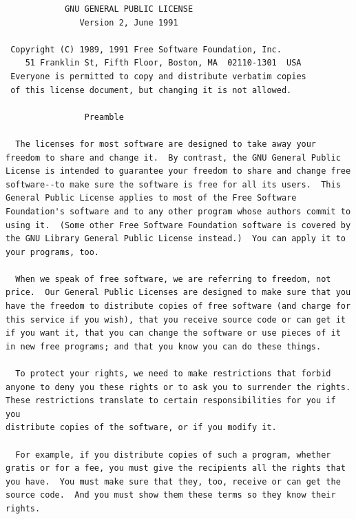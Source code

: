 \documentclass[mingoth,a4paper]{jsarticle}
\begin{document}

\begin{multicols}{2}
 \begin{fontsize}{6}{6}
 \begin{verbatim}
            GNU GENERAL PUBLIC LICENSE
               Version 2, June 1991

 Copyright (C) 1989, 1991 Free Software Foundation, Inc.
    51 Franklin St, Fifth Floor, Boston, MA  02110-1301  USA
 Everyone is permitted to copy and distribute verbatim copies
 of this license document, but changing it is not allowed.

                Preamble

  The licenses for most software are designed to take away your
freedom to share and change it.  By contrast, the GNU General Public
License is intended to guarantee your freedom to share and change free
software--to make sure the software is free for all its users.  This
General Public License applies to most of the Free Software
Foundation's software and to any other program whose authors commit to
using it.  (Some other Free Software Foundation software is covered by
the GNU Library General Public License instead.)  You can apply it to
your programs, too.

  When we speak of free software, we are referring to freedom, not
price.  Our General Public Licenses are designed to make sure that you
have the freedom to distribute copies of free software (and charge for
this service if you wish), that you receive source code or can get it
if you want it, that you can change the software or use pieces of it
in new free programs; and that you know you can do these things.

  To protect your rights, we need to make restrictions that forbid
anyone to deny you these rights or to ask you to surrender the rights.
These restrictions translate to certain responsibilities for you if you
distribute copies of the software, or if you modify it.

  For example, if you distribute copies of such a program, whether
gratis or for a fee, you must give the recipients all the rights that
you have.  You must make sure that they, too, receive or can get the
source code.  And you must show them these terms so they know their
rights.


\end{verbatim}
\end{fontsize}
\end{multicols}
\end{document}
